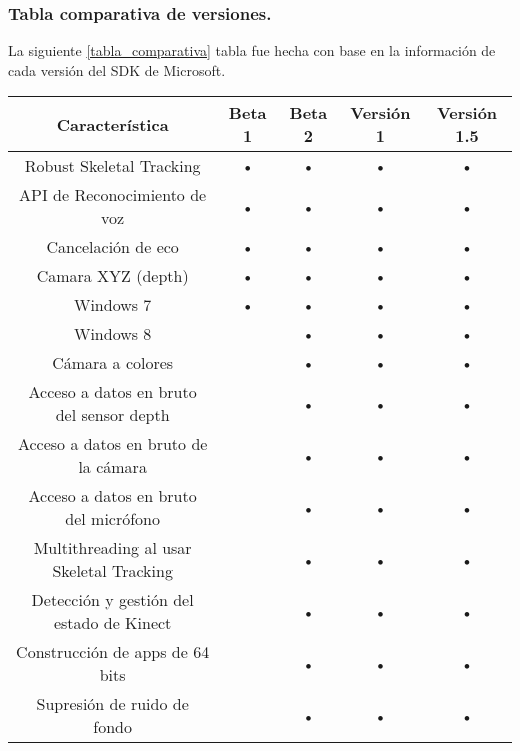 \documentclass[11pt,a4paper]{article}
\begin{document}
\subsubsection{Tabla comparativa de versiones.}
La siguiente \ref{tabla_comparativa} tabla fue hecha con base en la información de cada versión del SDK de Microsoft.
\newline
\newline
\begin{table}[h]
	\begin{tabular}{||c||c||c||c||c||}
		\hline Característica                           & Beta 1 & Beta 2 & Versión 1 & Versión 1.5 \\ 
		\hline Robust Skeletal Tracking                 & •      & •      & •         & •           \\ 
		\hline API de Reconocimiento de voz             & •      & •      & •         & •           \\ 
		\hline Cancelación de eco                       & •      & •      & •         & •           \\ 
		\hline Camara XYZ (depth)                       & •      & •      & •         & •           \\ 
		\hline Windows 7                                & •      & •      & •         & •           \\ 
		\hline Windows 8                                &        & •      & •         & •           \\ 
		\hline Cámara a colores                         &        & •      & •         & •           \\ 
		\hline Acceso a datos en bruto del sensor depth &        & •      & •         & •           \\ 
		\hline Acceso a datos en bruto de la cámara     &        & •      & •         & •           \\ 
		\hline Acceso a datos en bruto del micrófono    &        & •      & •         & •           \\ 
		\hline Multithreading al usar Skeletal Tracking &        & •      & •         & •           \\ 
		\hline Detección y gestión del estado de Kinect &        & •      & •         & •           \\ 
		\hline Construcción de apps de 64 bits          &        & •      & •         & •           \\ 
		\hline Supresión de ruido de fondo              &        & •      & •         & •           \\ 

\end{tabular}
\end{table}
\end{document}
